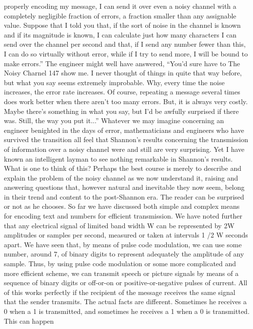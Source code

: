 {{{properly encoding my message, I can send it over even a noisy
channel with a completely negligible fraction of errors, a fraction
smaller than any assignable value. Suppose that I told you that, if
the sort of noise in the channel is known and if its magnitude is
known, I can calculate just how many characters I can send over
the channel per second and that, if I send any number fewer than
this, I can do so virtually without error, while if I try to send more,
I will be bound to make errors.”
The engineer might well have answered, “You’d sure have to
The Noisy Charnel
147
show me. I never thought of things in quite that way before, but
what you say seems extremely improbable. Why, every time the
noise increases, the error rate increases. Of course, repeating a
message several times does work better when there aren’t too many
errors. But, it is always very costly. Maybe there’s something in
what you say, but I’d be awfully surprised if there was. Still, the
way you put it...”
Whatever we may imagine concerning an engineer benighted in
the days of error, mathematicians and engineers who have survived
the transition all feel that Shannon’s results concerning the transmission
of information over a noisy channel were and still are very
surprising. Yet I have known an intelligent layman to see nothing
remarkable in Shannon’s results. What is one to think of this?
Perhaps the best course is merely to describe and explain the
problem of the noisy channel as we now understand it, raising and
answering questions that, however natural and inevitable they now
seem, belong in their trend and content to the post-Shannon era.
The reader can be surprised or not as he chooses.
So far we have discussed both simple and complex means for
encoding text and numbers for efficient transmission. We have
noted further that any electrical signal of limited band width W
can be represented by 2W amplitudes or samples per second,
measured or taken at intervals 1 /2 W seconds apart. We have seen
that, by means of pulse code modulation, we can use some number,
around 7, of binary digits to represent adequately the amplitude
of any sample. Thus, by using pulse code modulation or some
more complicated and more efficient scheme, we can transmit
speech or picture signals by means of a sequence of binary digits
or off-or-on or positive-or-negative pulses of current.
All of this works perfectly if the recipient of the message receives
the same signal that the sender transmits. The actual facts are different.
Sometimes he receives a 0 when a 1 is transmitted, and
sometimes he receives a 1 when a 0 is transmitted. This can happen
}}}
